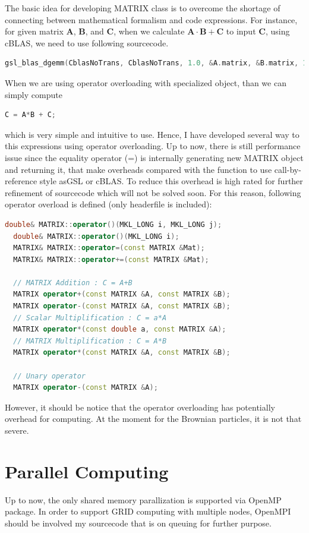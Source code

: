 \documentclass[10pt, a4paper]{article}
\begin{document}
\begin{appendices}
The basic idea for developing MATRIX class is to overcome the shortage of connecting between mathematical formalism and code expressions. For instance, for given matrix $\mathbf{A}$, $\mathbf{B}$, and $\mathbf{C}$, when we calculate $\mathbf{A}\cdot\mathbf{B} + \mathbf{C}$ to input $\mathbf{C}$, using cBLAS, we need to use following sourcecode.
\begin{lstlisting}[language=C++,frame=single,numbers=none]
gsl_blas_dgemm(CblasNoTrans, CblasNoTrans, 1.0, &A.matrix, &B.matrix, 1.0, &C.matrix);
\end{lstlisting}
When we are using operator overloading with specialized object, than we can simply compute
\begin{lstlisting}[language=C++,frame=single,numbers=none]
C = A*B + C;
\end{lstlisting}
which is very simple and intuitive to use. Hence, I have developed several way to this expressions using operator overloading. Up to now, there is still performance issue since the equality operator (=) is internally generating new MATRIX object and returning it, that make overheads compared with the function to use call-by-reference style asGSL or cBLAS. To reduce this overhead is high rated for further refinement of sourcecode which will not be solved soon. For this reason, following operator overload is defined (only headerfile is included):
\begin{lstlisting}[language=C++,frame=single]
  double& MATRIX::operator()(MKL_LONG i, MKL_LONG j);                 
  double& MATRIX::operator()(MKL_LONG i);
  MATRIX& MATRIX::operator=(const MATRIX &Mat);
  MATRIX& MATRIX::operator+=(const MATRIX &Mat);

  // MATRIX Addition : C = A+B
  MATRIX operator+(const MATRIX &A, const MATRIX &B); 
  MATRIX operator-(const MATRIX &A, const MATRIX &B); 
  // Scalar Multiplification : C = a*A
  MATRIX operator*(const double a, const MATRIX &A);  
  // MATRIX Multiplification : C = A*B
  MATRIX operator*(const MATRIX &A, const MATRIX &B); 

  // Unary operator
  MATRIX operator-(const MATRIX &A);                       
\end{lstlisting}

However, it should be notice that the operator overloading has potentially overhead for computing. At the moment for the Brownian particles, it is not that severe. 

\section{Parallel Computing}
Up to now, the only shared memory parallization is supported via OpenMP package. In order to support GRID computing with multiple nodes, OpenMPI should be involved my sourcecode that is on queuing for further purpose. 


\end{appendices}
\end{document}
